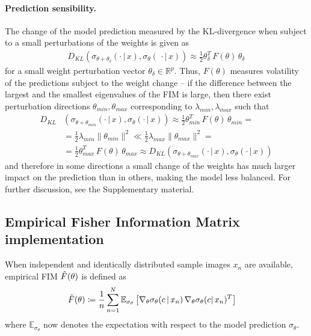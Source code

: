 \paragraph{Prediction sensibility.}
The change of the model prediction measured by the KL-divergence when subject to a small perturbations of the weights is given as
\begin{align}
    D_{KL}(\sigma_{\theta+\theta_\delta}(\cdot\,|\,x), \sigma_{\theta}(\,\cdot|\,x))\approx\frac{1}{2}\theta_\delta^T\,F(\theta)\,\theta_\delta
\end{align}
for a small weight perturbation vector $\theta_\delta\in\mathbb{R}^p$. Thus, $F(\theta)$ measures volatility of the predictions subject to the weight change -- if the difference between the largest and the smallest eigenvalues of the FIM is large, then there exist perturbation directions $\theta_{min}, \theta_{max}$ corresponding to $\lambda_{min}, \lambda_{max}$ such that
\begin{align}
    D_{KL}&(\sigma_{\theta+\theta_{min}}(\cdot\,|\,x), \sigma_{\theta}(\cdot\,|\,x)) 
    \approx\frac{1}{2}\theta_{min}^T\,F(\theta)\,\theta_{min} = \nonumber\\
    &=\frac{1}{2}\lambda_{min}\|\theta_{min}\|^2\ll\frac{1}{2}\lambda_{max}\|\theta_{max}\|^2 = \\
    &=\frac{1}{2}\theta_{max}^T\,F(\theta)\,\theta_{max}
    \approx D_{KL}(\sigma_{\theta+\theta_{max}}(\cdot\,|\,x), \sigma_{\theta}(\cdot\,|\,x)) \nonumber
\end{align}
and therefore in some directions a small change of the weights has much larger impact on the prediction than in others, making the model less balanced. For further discussion, see the Supplementary material.

\subsection{Empirical Fisher Information Matrix implementation}
\label{subsec:empiricalFIM}
When independent and identically distributed sample images $x_n$ are available, empirical FIM $\Hat{F}(\theta)$ is defined as
\begin{align}
\Hat{F}(\theta)&\coloneq\frac{1}{n}\sum_{n=1}^N\mathbb{E}_{\sigma_\theta}\left[\nabla_{\theta}\sigma_\theta(c\,|\,x_n)\,\nabla_{\theta}\sigma_\theta(c|\,x_n)^T\right]
    \label{eq:fim_epirical}
\end{align}
where $\mathbb{E}_{\sigma_\theta}$ now denotes the expectation with respect to the model prediction $\sigma_\theta$.

